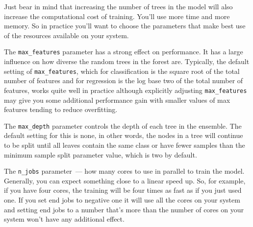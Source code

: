 Just bear in mind that increasing the number of trees in the model will also increase the computational cost of training. You'll use more time and more memory. So in practice you'll want to choose the parameters that make best use of the resources available on your system. 

The \texttt{max_features} parameter has a strong effect on performance. It has a large influence on how diverse the random trees in the forest are. Typically, the default setting of \texttt{max_features}, which for classification is the square root of the total number of features and for regression is the log base two of the total number of features, works quite well in practice although explicitly adjusting \texttt{max_features} may give you some additional performance gain with smaller values of max features tending to reduce overfitting. 

The \texttt{max_depth} parameter controls the depth of each tree in the ensemble. The default setting for this is none, in other words, the nodes in a tree will continue to be split until all leaves contain the same class or have fewer samples than the minimum sample split parameter value, which is two by default. 

The \texttt{n_jobs} parameter~--- how many cores to use in parallel to train the model. Generally, you can expect something close to a linear speed up. So, for example, if you have four cores, the training will be four times as fast as if you just used one. If you set end jobs to negative one it will use all the cores on your system and setting end jobs to a number that's more than the number of cores on your system won't have any additional effect. 
